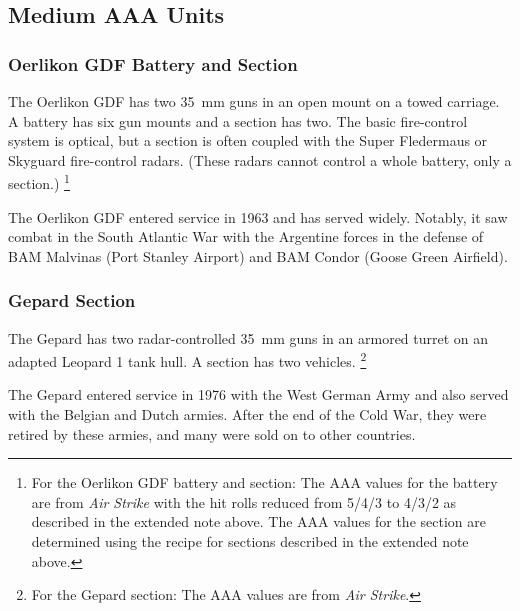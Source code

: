 \documentclass[10pt]{article}
\newcommand{\note}[1]{%
    \footnote{%
        \setlength{\parindent}{0pt}%
        \setlength{\parskip}{\smallskipamount}%
        #1
    }%
}
\begin{document}

\subsection{Medium AAA Units}

\subsubsection{Oerlikon GDF Battery and Section}

The Oerlikon GDF has two 35~mm guns in an open mount on a towed carriage.
A battery has six gun mounts and a section has two.
The basic fire-control system is optical, but a section is often coupled with the Super Fledermaus or Skyguard fire-control radars.
(These radars cannot control a whole battery, only a section.)%
\note{
    For the Oerlikon GDF battery and section: The AAA values for the battery are from \emph{Air Strike} with the hit rolls reduced from 5/4/3 to 4/3/2 as described in the extended note above.
    The AAA values for the section are determined using the recipe for sections described in the extended note above.
}

The Oerlikon GDF entered service in 1963 and has served widely. Notably, it saw combat in the South Atlantic War with the Argentine forces in the defense of BAM Malvinas (Port Stanley Airport) and BAM Condor (Goose Green Airfield).

\subsubsection{Gepard Section}

The Gepard has two radar-controlled 35~mm guns in an armored turret on an adapted Leopard 1 tank hull. A section has two vehicles.%
\note{
    For the Gepard section: The AAA values are from \emph{Air Strike}.
}

The Gepard entered service in 1976 with the West German Army and also served with the Belgian and Dutch armies. After the end of the Cold War, they were retired by these armies, and many were sold on to other countries.
\end{document}
